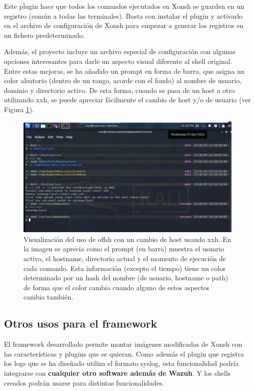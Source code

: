 Este plugin hace que todos los comandos ejecutados en Xonsh se guarden en un registro (común a todas las terminales). Basta con instalar el plugin y activarlo en el archivo de configuración de Xonsh para empezar a generar los registros en un fichero predeterminado.

Además, el proyecto incluye un archivo especial de configuración con algunas opciones interesantes para darle un aspecto visual diferente al shell original. Entre estas mejoras, se ha añadido un prompt en forma de barra, que asigna un color aleatorio (dentro de un rango, acorde con el fondo) al nombre de usuario, dominio y directorio activo. De esta forma, cuando se pasa de un host a otro utilizando xxh, se puede apreciar fácilmente el cambio de host y/o de usuario (ver Figura \ref{offsh_example}).


\begin{figure}[!hbt]
  \centering
  \includegraphics[width=\textwidth]{imagenes/offsh_Example.png}
  \caption{Visualización del uso de offsh con un cambio de host usando xxh. En la imagen se aprecia como el prompt (en barra) muestra el usuario activo, el hostname, directorio actual y el momento de ejecución de cada comando. Esta información (excepto el tiempo) tiene un color determinado por un hash del nombre (de usuario, hostname o path) de forma que el color cambia cuando alguno de estos aspectos cambia también.}
  \label{offsh_example}
\end{figure}


\subsection{Otros usos para el framework}

El framework desarrollado permite montar imágenes modificadas de Xonsh con las características y plugins que se quieran. Como además el plugin que registra los logs que se ha diseñado utiliza el formato syslog, esta funcionalidad podría integrarse con \textbf{cualquier otro software además de Wazuh}. Y los shells creados podrán usarse para distintas funcionalidades.

